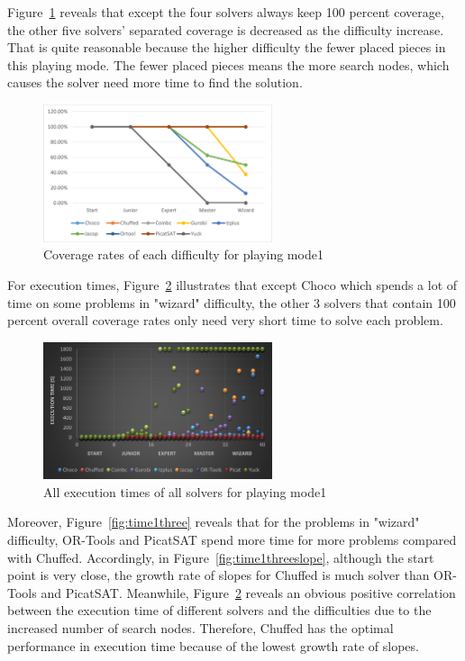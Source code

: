 Figure~\ref{fig:mode1eva4} reveals that except the four solvers always keep 100 percent coverage, the other five solvers' separated coverage is decreased as the difficulty increase. That is quite reasonable because the higher difficulty the fewer placed pieces in this playing mode. The fewer placed pieces means the more search nodes, which causes the solver need more time to find the solution.
\begin{figure}[H]
    \centering
    \includegraphics[width=0.6\textwidth]{figs/mode1seperatedcoverage.png}
    \caption{Coverage rates of each difficulty for playing mode1}
    \label{fig:mode1eva4}
\end{figure}
For execution times, Figure~\ref{fig:mode1time1} illustrates that except Choco which spends a lot of time on some problems in  "wizard" difficulty, the other 3 solvers that contain 100 percent overall coverage rates only need very short time to solve each problem. 
\begin{figure}[htbp]
\centering
\includegraphics[width=0.6\textwidth]{figs/time1all.png}
\caption{All execution times of all solvers for playing mode1}
\label{fig:mode1time1}
\end{figure}
Moreover, Figure~\ref{fig:time1three} reveals that for the problems in "wizard" difficulty, OR-Tools and PicatSAT spend more time for more problems compared with Chuffed. Accordingly, in Figure~\ref{fig:time1threeslope}, although the start point is very close, the growth rate of slopes for Chuffed is much solver than OR-Tools and PicatSAT. Meanwhile, Figure~\ref{fig:mode1time1} reveals an obvious positive correlation between the execution time of different solvers and the difficulties due to the increased number of search nodes. Therefore, Chuffed has the optimal performance in execution time because of the lowest growth rate of slopes. 
